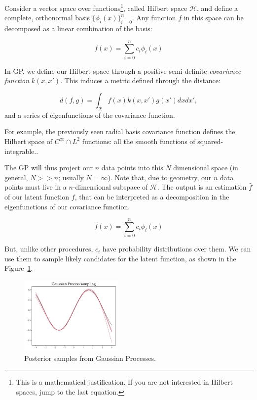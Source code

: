 Consider a vector space over functions\footnote{This is a mathematical justification. If you are not interested in Hilbert spaces, jump to the last equation.}, called Hilbert space $\mathscr{H}$, and define a complete, orthonormal basis $\{\phi_i(x)\}_{i=0}^{n}$.
Any function $f$ in this space can be decomposed as a linear combination of the basis:

 \[f(x) = \sum_{i=0}^{n} c_i \phi_i(x)\]
 
In GP, we define our Hilbert space through a positive semi-definite \emph{covariance function} $k(x, x')$.
This induces a metric defined through the distance:

	\[	d(f, g) =\int_{\mathcal{R}}  f(x) k(x, x') g(x') dx dx', \]
and a series of eigenfunctions of the covariance function.
	
For example, the previously seen radial basis covariance function defines the Hilbert space of $C^\infty \cap L^2$ functions: all the smooth functions of squared-integrable..
	
The GP will thus project our $n$ data points into this $N$ dimensional space (in general, $N >> n$; usually $N = \infty$). Note that, due to geometry, our $n$ data points must live in a $n$-dimensional subspace of $\mathscr{H}$.
The output is an estimation $\hat f$ of our latent function $f$, that can be interpreted as a decomposition in the eigenfunctions of our covariance function.
	
	\[\hat f(x) = \sum_{i=0}^{n} c_i \phi_i(x)\]
	
But, unlike other procedures, $c_i$ have probability distributions over them.
We can use them to sample likely candidates for the latent function, as shown in the Figure~\ref{fig:gp_sampling}.
	
\begin{figure}[hbt]
\centering
	\includegraphics[width=0.45\textwidth]{machine_learning/figures/sin_samples}
	\caption{Posterior samples from Gaussian Processes.}\label{fig:gp_sampling}
\end{figure}

